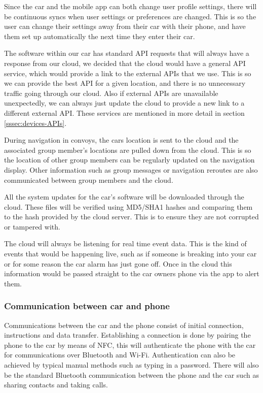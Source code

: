\documentclass{article}
\begin{document}
Since the car and the mobile app can both change user profile settings, there will be continuous syncs when user settings or preferences are changed. This is so the user can change their settings away from their car with their phone, and have them set up automatically the next time they enter their car.

The software within our car has standard API requests that will always have a response from our cloud, we decided that the cloud would have a general API service, which would provide a link to the external APIs that we use. This is so we can provide the best API for a given location, and there is no unnecessary traffic going through our cloud. Also if external APIs are unavailable unexpectedly, we can always just update the cloud to provide a new link to a different external API. These services are mentioned in more detail in section \ref{sssec:devices-APIs}.

During navigation in convoys, the cars location is sent to the cloud and the associated group member's locations are pulled down from the cloud. This is so the location of other group members can be regularly updated on the navigation display. Other information such as group messages or navigation reroutes are also communicated between group members and the cloud.

All the system updates for the car's software will be downloaded through the cloud. These files will be verified using MD5/SHA1 hashes and comparing them to the hash provided by the cloud server. This is to ensure they are not corrupted or tampered with.

The cloud will always be listening for real time event data. This is the kind of events that would be happening live, such as if someone is breaking into your car or for some reason the car alarm has just gone off. Once in the cloud this information would be passed straight to the car owners phone via the app to alert them.

\subsubsection{Communication between car and phone}\label{sssec:car-phone}
Communications between the car and the phone consist of initial connection, instructions and data transfer. Establishing a connection is done by pairing the phone to the car by means of NFC, this will authenticate the phone with the car for communications over Bluetooth and Wi-Fi. Authentication can also be achieved by typical manual methods such as typing in a password. There will also be the standard Bluetooth communication between the phone and the car such as sharing contacts and taking calls.
\end{document}
